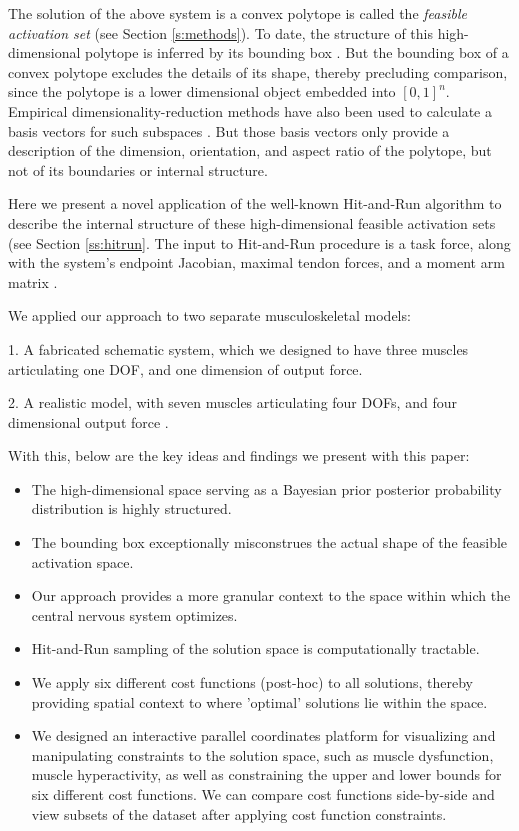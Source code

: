 The solution of the above system is a convex polytope is called the \emph{feasible activation set} (see Section \ref{s:methods}). To date, the structure of this high-dimensional polytope is inferred by its bounding box  \cite{kutch2011muscle,sohn2013cat_bounding_box,Valero-Cuevas2015high-dimensional}.  But the bounding box of a convex polytope excludes the details of its shape, thereby precluding comparison, since the polytope is a lower dimensional object embedded into $[0,1]^n$.  Empirical dimensionality-reduction methods have also been used to calculate a basis vectors for such subspaces \cite{Clewley2008Estimating,davella2005shared,krishnamoorthy2003muscle}. But those basis  vectors only provide a description of the dimension, orientation, and aspect ratio of the polytope, but not of its boundaries or internal  structure.

Here we present a novel application of the well-known Hit-and-Run algorithm \cite{smith1984efficient} to describe the internal structure of these high-dimensional feasible activation sets (see Section \ref{ss:hitrun}.
The input to Hit-and-Run procedure is a task force, along with the system's endpoint Jacobian, maximal tendon forces, and a moment arm matrix \cite{Valero-Cuevas2009mathematical}.

We applied our approach to two separate musculoskeletal models:

1. A fabricated schematic system, which we designed to have three muscles articulating one DOF, and one dimension of output force.

2. A realistic model, with seven muscles articulating four DOFs, and four dimensional output force \cite{Valero-Cuevas1998Large}.

With this, below are the key ideas and findings we present with this paper:

\begin{itemize}
\item {The high-dimensional space serving as a Bayesian prior posterior probability distribution is highly structured.}
\item {The bounding box exceptionally misconstrues the actual shape of the feasible activation space.}
\item {Our approach provides a more granular context to the space within which the central nervous system optimizes.}
\item {Hit-and-Run sampling of the solution space is computationally tractable.}%
\item {We apply six different cost functions (post-hoc) to all solutions, thereby providing spatial context to where 'optimal' solutions lie within the space.}
\item {We designed an interactive parallel coordinates platform for visualizing and manipulating constraints to the solution space, such as muscle dysfunction, muscle hyperactivity, as well as constraining the upper and lower bounds for six different cost functions. We can compare cost functions side-by-side and view subsets of the dataset after applying cost function constraints. }
\end{itemize}

